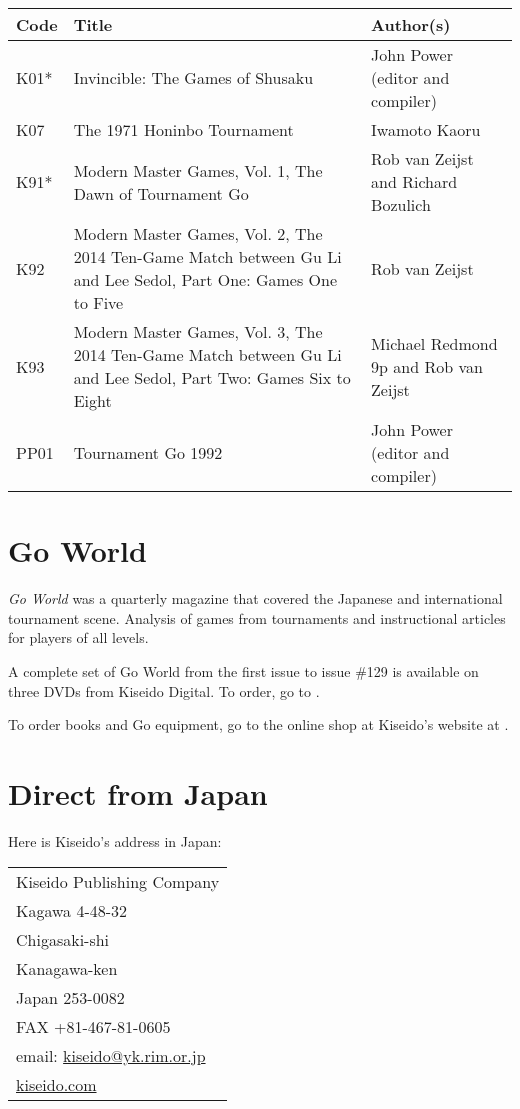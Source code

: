 \begin{longtable}{l|p{45mm}|p{25mm}} 
    \hline
    \textbf{Code} & \textbf{Title} & \textbf{Author(s)} \\
    \hline \hline
    K01* & Invincible: The Games of Shusaku & John Power (editor and compiler) \\
    \hline
    K07 & The 1971 Honinbo Tournament & Iwamoto Kaoru \\
    \hline
    K91* & Modern Master Games, Vol. 1, The Dawn of Tournament Go & Rob van Zeijst and Richard Bozulich \\
    \hline
    K92 & Modern Master Games, Vol. 2, The 2014 Ten-Game Match between Gu Li and Lee Sedol, Part One: Games One to Five & Rob van Zeijst \\
    \hline
    K93 & Modern Master Games, Vol. 3, The 2014 Ten-Game Match between Gu Li and Lee Sedol, Part Two: Games Six to Eight & Michael Redmond 9p and Rob van Zeijst \\
    \hline
    PP01 & Tournament Go 1992 & John Power (editor and compiler) \\
    \hline
\end{longtable}

\section{Go World}

\emph{Go World} was a quarterly magazine that covered the Japanese and international tournament scene. Analysis of games from tournaments and instructional articles for players of all levels.

A complete set of Go World from the first issue to issue \#129 is available on three DVDs from Kiseido Digital. To order, go to \href{https://www.kiseidodigital.com}{}.

To order books and Go equipment, go to the online shop at Kiseido's website at \href{https://www.kiseido.com}{}.

\section{Direct from Japan}

Here is Kiseido's address in Japan:

\bigskip
\medskip

\begin{tabular}{l}
    \hline
    Kiseido Publishing Company \\
    Kagawa 4-48-32 \\
    Chigasaki-shi \\
    Kanagawa-ken \\
    Japan 253-0082 \\
    FAX +81-467-81-0605 \\
    email: \href{mailto:kiseido@yk.rim.or.jp}{kiseido@yk.rim.or.jp} \\
    \href{https://www.kiseido.com}{kiseido.com} \\
    \hline
\end{tabular}